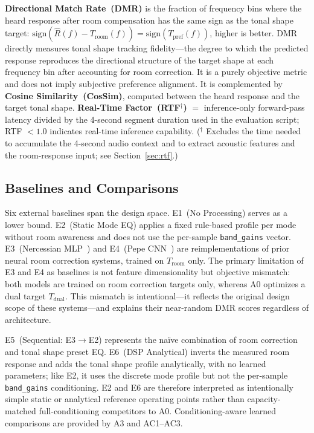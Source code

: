 \documentclass{aes2e}
\begin{document}
\textbf{Directional Match Rate~(DMR)} is the fraction of frequency bins where
the heard response after room compensation has the same sign as the tonal
shape target:
$\text{sign}(\hat{R}(f)-T_\text{room}(f)) =
\text{sign}(T_\text{pref}(f))$, higher is better.
DMR directly measures tonal shape tracking fidelity---the degree to which
the predicted response reproduces the directional structure of the target
shape at each frequency bin after accounting for room correction.
It is a purely objective metric and does not imply subjective preference
alignment.
It is complemented by \textbf{Cosine Similarity~(CosSim)}, computed between
the heard response and the target tonal shape.
\textbf{Real-Time Factor~(RTF$^\dagger$)} $=$ inference-only forward-pass
latency divided by the 4-second segment duration used in the evaluation
script; RTF $< 1.0$ indicates real-time inference capability.
($^\dagger$ Excludes the time needed to accumulate the 4-second audio
context and to extract acoustic features and the room-response input;
see Section~\ref{sec:rtf}.)

\subsection{Baselines and Comparisons}

Six external baselines span the design space.
E1~(No Processing) serves as a lower bound.
E2~(Static Mode EQ) applies a fixed rule-based profile per mode without
room awareness and does not use the per-sample \texttt{band\_gains} vector.
E3~(Nercessian MLP~\cite{nercessian2020}) and E4~(Pepe CNN~\cite{pepe2020})
are reimplementations of prior neural room correction systems, trained on
$T_\text{room}$ only.
The primary limitation of E3 and E4 as baselines is not feature dimensionality
but objective mismatch: both models are trained on room correction targets
only, whereas A0 optimizes a dual target $T_\text{dual}$.
This mismatch is intentional---it reflects the original design scope of
these systems---and explains their near-random DMR scores regardless of
architecture.

E5~(Sequential: E3$\to$E2) represents the na\"{i}ve combination of room
correction and tonal shape preset EQ.
E6~(DSP Analytical) inverts the measured room response and adds the tonal
shape profile analytically, with no learned parameters; like E2, it uses
the discrete mode profile but not the per-sample \texttt{band\_gains}
conditioning.
E2 and E6 are therefore interpreted as intentionally simple static or
analytical reference operating points rather than capacity-matched
full-conditioning competitors to A0. Conditioning-aware learned comparisons
are provided by A3 and AC1--AC3.
\end{document}
